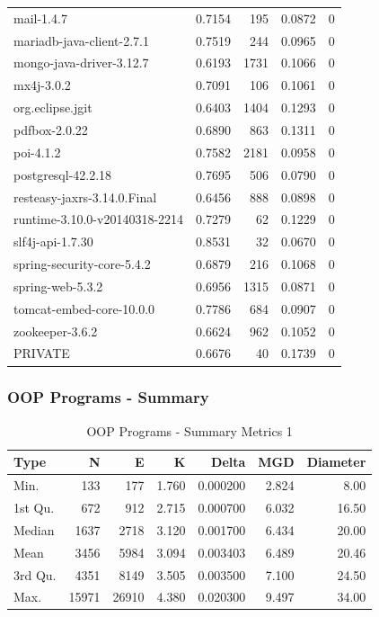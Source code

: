 \documentclass[12pt, a4paper]{article}
\begin{document}
\begin{longtable}[H]{l r r r r}
        mail-1.4.7                    &  0.7154 &   195 &  0.0872 & 0 \\  
        mariadb-java-client-2.7.1     &  0.7519 &   244 &  0.0965 & 0 \\  
        mongo-java-driver-3.12.7      &  0.6193 &  1731 &  0.1066 & 0 \\  
        mx4j-3.0.2                    &  0.7091 &   106 &  0.1061 & 0 \\  
        org.eclipse.jgit              &  0.6403 &  1404 &  0.1293 & 0 \\  
        pdfbox-2.0.22                 &  0.6890 &   863 &  0.1311 & 0 \\  
        poi-4.1.2                     &  0.7582 &  2181 &  0.0958 & 0 \\  
        postgresql-42.2.18            &  0.7695 &   506 &  0.0790 & 0 \\  
        resteasy-jaxrs-3.14.0.Final   &  0.6456 &   888 &  0.0898 & 0 \\  
        runtime-3.10.0-v20140318-2214 &  0.7279 &    62 &  0.1229 & 0 \\  
        slf4j-api-1.7.30              &  0.8531 &    32 &  0.0670 & 0 \\  
        spring-security-core-5.4.2    &  0.6879 &   216 &  0.1068 & 0 \\  
        spring-web-5.3.2              &  0.6956 &  1315 &  0.0871 & 0 \\  
        tomcat-embed-core-10.0.0      &  0.7786 &   684 &  0.0907 & 0 \\  
        zookeeper-3.6.2               &  0.6624 &   962 &  0.1052 & 0 \\  
        PRIVATE                       &  0.6676 &    40 &  0.1739 & 0  
\end{longtable}

\subsubsection{OOP Programs - Summary}
\begin{longtable}[H]{l r r r r r r}
    \caption{OOP Programs - Summary Metrics 1}\label{table:oop_sum_metrics_1}\\
        Type & N & E & K & Delta & MGD & Diameter\\
        \hline            
        \endhead
        Min.    &   133 &   177 & 1.760 & 0.000200 & 2.824 &  8.00\\  
        1st Qu. &   672 &   912 & 2.715 & 0.000700 & 6.032 & 16.50\\  
        Median  &  1637 &  2718 & 3.120 & 0.001700 & 6.434 & 20.00\\  
        Mean    &  3456 &  5984 & 3.094 & 0.003403 & 6.489 & 20.46\\  
        3rd Qu. &  4351 &  8149 & 3.505 & 0.003500 & 7.100 & 24.50\\  
        Max.    & 15971 & 26910 & 4.380 & 0.020300 & 9.497 & 34.00  
\end{longtable}
\end{document}
